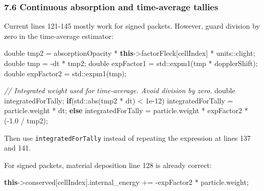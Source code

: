 \documentclass[
]{article}
\newenvironment{Shaded}{}{}
\newcommand{\BuiltInTok}[1]{\textcolor[rgb]{0.00,0.50,0.00}{#1}}
\newcommand{\CommentTok}[1]{\textcolor[rgb]{0.38,0.63,0.69}{\textit{#1}}}
\newcommand{\ControlFlowTok}[1]{\textcolor[rgb]{0.00,0.44,0.13}{\textbf{#1}}}
\newcommand{\DataTypeTok}[1]{\textcolor[rgb]{0.56,0.13,0.00}{#1}}
\newcommand{\FloatTok}[1]{\textcolor[rgb]{0.25,0.63,0.44}{#1}}
\newcommand{\KeywordTok}[1]{\textcolor[rgb]{0.00,0.44,0.13}{\textbf{#1}}}
\newcommand{\NormalTok}[1]{#1}
\newcommand{\OperatorTok}[1]{\textcolor[rgb]{0.40,0.40,0.40}{#1}}
\begin{document}
\subsubsection{7.6 Continuous absorption and time-average
tallies}\label{continuous-absorption-and-time-average-tallies}

Current lines 121-145 mostly work for signed packets. However, guard
division by zero in the time-average estimator:

\begin{Shaded}
\begin{Highlighting}[]
\DataTypeTok{double}\NormalTok{ tmp2 }\OperatorTok{=}\NormalTok{ absorptionOpacity }\OperatorTok{*} \KeywordTok{this}\OperatorTok{{-}\textgreater{}}\NormalTok{factorFleck}\OperatorTok{[}\NormalTok{cellIndex}\OperatorTok{]} \OperatorTok{*}\NormalTok{ units}\OperatorTok{::}\NormalTok{clight}\OperatorTok{;}
\DataTypeTok{double}\NormalTok{ tmp }\OperatorTok{=} \OperatorTok{{-}}\NormalTok{dt }\OperatorTok{*}\NormalTok{ tmp2}\OperatorTok{;}
\DataTypeTok{double}\NormalTok{ expFactor1 }\OperatorTok{=} \BuiltInTok{std::}\NormalTok{expm1}\OperatorTok{(}\NormalTok{tmp }\OperatorTok{*}\NormalTok{ dopplerShift}\OperatorTok{);}
\DataTypeTok{double}\NormalTok{ expFactor2 }\OperatorTok{=} \BuiltInTok{std::}\NormalTok{expm1}\OperatorTok{(}\NormalTok{tmp}\OperatorTok{);}

\CommentTok{// Integrated weight used for time{-}average. Avoid division by zero.}
\DataTypeTok{double}\NormalTok{ integratedForTally}\OperatorTok{;}
\ControlFlowTok{if}\OperatorTok{(}\BuiltInTok{std::}\NormalTok{abs}\OperatorTok{(}\NormalTok{tmp2 }\OperatorTok{*}\NormalTok{ dt}\OperatorTok{)} \OperatorTok{\textless{}} \FloatTok{1e{-}12}\OperatorTok{)}
\NormalTok{    integratedForTally }\OperatorTok{=}\NormalTok{ particle}\OperatorTok{.}\NormalTok{weight }\OperatorTok{*}\NormalTok{ dt}\OperatorTok{;}
\ControlFlowTok{else}
\NormalTok{    integratedForTally }\OperatorTok{=}\NormalTok{ particle}\OperatorTok{.}\NormalTok{weight }\OperatorTok{*}\NormalTok{ expFactor2 }\OperatorTok{*} \OperatorTok{({-}}\FloatTok{1.0} \OperatorTok{/}\NormalTok{ tmp2}\OperatorTok{);}
\end{Highlighting}
\end{Shaded}

Then use \texttt{integratedForTally} instead of repeating the expression
at lines 137 and 141.

For signed packets, material deposition line 128 is already correct:

\begin{Shaded}
\begin{Highlighting}[]
\KeywordTok{this}\OperatorTok{{-}\textgreater{}}\NormalTok{conserved}\OperatorTok{[}\NormalTok{cellIndex}\OperatorTok{].}\NormalTok{internal\_energy }\OperatorTok{+=} \OperatorTok{{-}}\NormalTok{expFactor2 }\OperatorTok{*}\NormalTok{ particle}\OperatorTok{.}\NormalTok{weight}\OperatorTok{;}
\end{Highlighting}
\end{Shaded}
\end{document}
